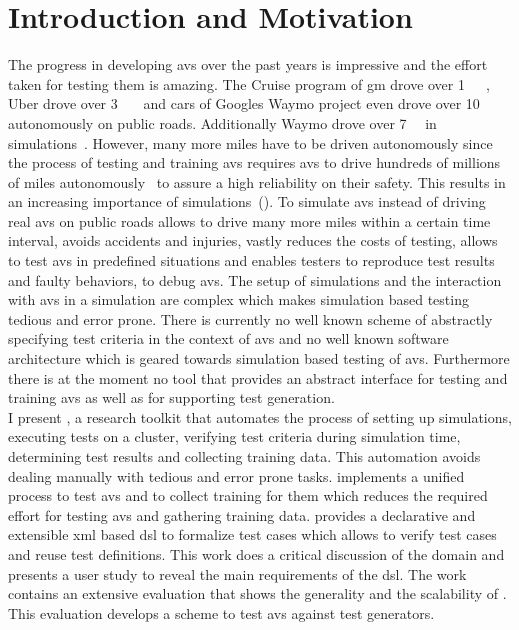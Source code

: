 \section{Introduction and Motivation}
\glsresetall%
The progress in developing \glspl{av} over the past years is impressive and the effort taken for testing them is amazing.
The Cruise program of \gls{gm} drove over \SI{1}{\million\mile}~\cite{cruiseMillions}, Uber drove over \SI{3}{\million\mile}~\cite{uberMillions} and cars of Googles Waymo project even drove over \SI{10}{\million\mile} autonomously on public roads.
Additionally Waymo drove over \SI{7}{\billion\mile} in simulations~\cite{waymoMillions}.
However, many more miles have to be driven autonomously since the process of testing and training \glspl{av} requires \glspl{av} to drive hundreds of millions of miles autonomously~\cite{millions} to assure a high reliability on their safety.
This results in an increasing importance of simulations~(\cite{simulationsImporantForbes,simulationsImporantBusinessInsider}).
To simulate \glspl{av} instead of driving real \glspl{av} on public roads allows to drive many more miles within a certain time interval, avoids accidents and injuries, vastly reduces the costs of testing, allows to test \glspl{av} in predefined situations and enables testers to reproduce test results and faulty behaviors, \ie{} to debug \glspl{av}.
The setup of simulations and the interaction with \glspl{av} in a simulation are complex which makes simulation based testing tedious and error prone.
There is currently no well known scheme of abstractly specifying test criteria in the context of \glspl{av} and no well known software architecture which is geared towards simulation based testing of \glspl{av}.
Furthermore there is at the moment no tool that provides an abstract interface for testing and training \glspl{av} as well as for supporting test generation.\\
I present \drivebuild{}, a research toolkit that automates the process of setting up simulations, executing tests on a cluster, verifying test criteria during simulation time, determining test results and collecting training data.
This automation avoids dealing manually with tedious and error prone tasks.
\drivebuild{} implements a unified process to test \glspl{av} and to collect training for them which reduces the required effort for testing \glspl{av} and gathering training data.
\drivebuild{} provides a declarative and extensible \gls{xml} based \gls{dsl} to formalize test cases which allows to verify test cases and reuse test definitions.
This work does a critical discussion of the domain and presents a user study to reveal the main requirements of the \gls{dsl}.
The work contains an extensive evaluation that shows the generality and the scalability of \drivebuild{}.
This evaluation develops a scheme to test \glspl{av} against test generators.\par

